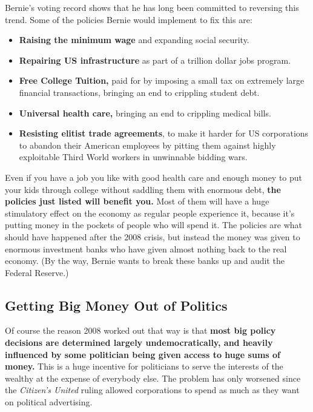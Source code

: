 \documentclass[notumble]{leaflet}
\begin{document}
Bernie's voting record shows that he has long been committed to
reversing this trend.  Some of the policies Bernie would implement to
fix this are:

\begin{itemize}

\item {\bf Raising the minimum wage} and expanding social security.

\item {\bf Repairing US infrastructure} as part of a trillion dollar
  jobs program.

\item {\bf Free College Tuition,} paid for by imposing a small tax on
  extremely large financial transactions, bringing an end to crippling
  student debt.

\item {\bf Universal health care,} bringing an end to crippling
  medical bills.

\item {\bf Resisting elitist trade agreements}, to make it harder for
  US corporations to abandon their American employees by pitting them
  against highly exploitable Third World workers in unwinnable bidding
  wars.

\end{itemize}

Even if you have a job you like with good health care and enough money
to put your kids through college without saddling them with enormous
debt, {\bf the policies just listed will benefit you.}  Most of them
will have a huge stimulatory effect on the economy as regular people
experience it, because it's putting money in the pockets of people who
will spend it.  The policies are what should have happened after the
2008 crisis, but instead the money was given to enormous investment
banks who have given almost nothing back to the real economy.  (By the
way, Bernie wants to break these banks up and audit the Federal
Reserve.)

\subsection*{Getting Big Money Out of Politics}

Of course the reason 2008 worked out that way is that {\bf most big
  policy decisions are determined largely undemocratically, and
  heavily influenced by some politician being given access to huge
  sums of money.}  This is a huge incentive for politicians to serve
the interests of the wealthy at the expense of everybody else.  The
problem has only worsened since the \emph{Citizen's United} ruling
allowed corporations to spend as much as they want on political
advertising.
\end{document}
